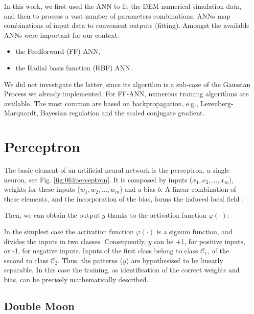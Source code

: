 In this work, we first used the \acs{ANN} to fit the \acs{DEM} numerical simulation
data, and then to process a vast number of parameters combinations. 
\acs{ANNs} map combinations of input data to convenient outputs (fitting). 
Amongst the available \acs{ANNs} were important for our context: 
\begin{itemize}
  \item {the Feedforward (\acs{FF}) \acs{ANN},}
  \item {the Radial basis function (\acs{RBF}) \acs{ANN}.}	
\end{itemize}
We did not investigate the latter, since its algorithm is a sub-case of the
Gaussian Process we already implemented.
For \acs{FF}-\acs{ANN},
numerous training algorithms are available. 
The most common are based on
backpropagation, e.g., Levenberg-Marquardt, Bayesian regulation and the scaled
conjugate gradient.

\section{Perceptron}
\label{sec:perceptron}

The basic element of an artificial neural network is the perceptron, a single
neuron, see Fig.
\ref{fig:064perceptron}.
It is composed by inputs ($x_1, x_2, \ldots, x_m$), weights for these inputs
($w_1, w_2, \ldots, w_m$) and a bias $b$.
A linear combination of these elements, and the incorporation of the bias, 
forms the induced local field \cite{RefWorks:158}: 

Then, we can obtain the output $y$ thanks to the activation function
$\varphi(\cdot)$:


In the simplest case the activation function $\varphi(\cdot)$ is a signum
function, and divides the inputs in two classes.
Consequently, $y$ can be +1, for positive inputs, or -1, for negative inputs. Inputs of the first class
belong to class $\mathscr{C}_1$, of the second to class $\mathscr{C}_2$.
Thus, the patterns ($y$) are hypothesised to be linearly separable.
In this case the training, as identification of the correct weights and bias,
can be precisely mathematically described. \\


\subsection{Double Moon}
\label{subsec:doublemoon}

